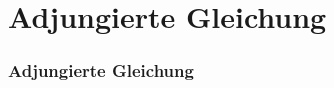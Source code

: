 \section[Problemstellung]{Adjungierte Gleichung}
\begin{frame}[<+->]
\frametitle{Adjungierte Gleichung}


\end{frame}
